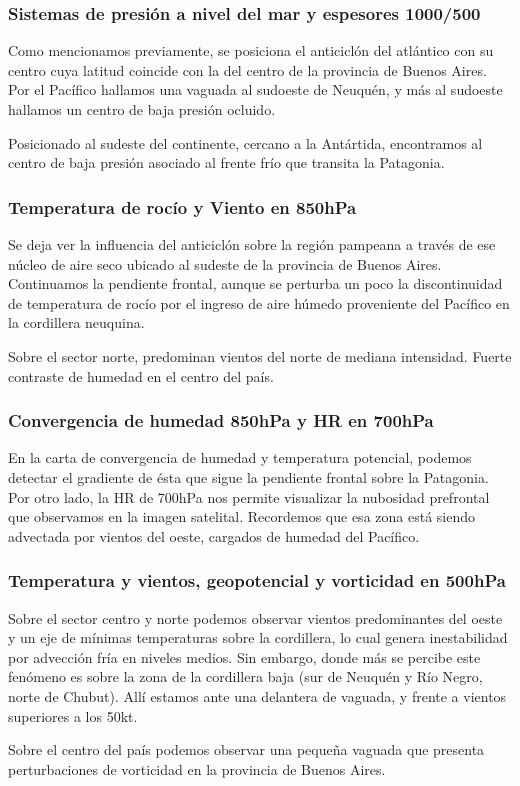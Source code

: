\documentclass{article}
\begin{document}
\subsubsection{Sistemas de presión a nivel del mar y espesores 1000/500}
Como mencionamos previamente, se posiciona el anticiclón del atlántico con su centro cuya latitud coincide con la del centro de 
la provincia de Buenos Aires. Por el Pacífico hallamos una vaguada al sudoeste de Neuquén, y más al sudoeste hallamos un centro
de baja presión ocluido.
\par Posicionado al sudeste del continente, cercano a la Antártida, encontramos al centro de baja presión asociado al frente frío que
transita la Patagonia.

\subsubsection{Temperatura de rocío y Viento en 850hPa}
Se deja ver la influencia del anticiclón sobre la región pampeana a través de ese 
núcleo de aire seco ubicado al sudeste de la provincia de Buenos Aires. Continuamos la pendiente frontal, aunque
se perturba un poco la discontinuidad de temperatura de rocío por el ingreso de aire húmedo proveniente del
Pacífico en la cordillera neuquina.
\par Sobre el sector norte, predominan vientos del norte de mediana intensidad. Fuerte contraste de humedad en el centro del país.

\subsubsection{Convergencia de humedad 850hPa y HR en 700hPa}
En la carta de convergencia de humedad y temperatura potencial, podemos detectar el gradiente de ésta que sigue la pendiente frontal
sobre la Patagonia. Por otro lado, la HR de 700hPa nos permite visualizar la nubosidad prefrontal que observamos en la imagen satelital.
Recordemos que esa zona está siendo advectada por vientos del oeste, cargados de humedad del Pacífico.

\subsubsection{Temperatura y vientos, geopotencial y vorticidad en 500hPa}
Sobre el sector centro y norte podemos observar vientos predominantes del oeste y un eje de mínimas temperaturas sobre la cordillera,
lo cual genera inestabilidad por advección fría en niveles medios. Sin embargo, donde más se percibe este fenómeno es sobre la zona de 
la cordillera baja (sur de Neuquén y Río Negro, norte de Chubut). Allí estamos ante una delantera de vaguada, y frente a vientos
superiores a los 50kt.
\par Sobre el centro del país podemos observar una pequeña vaguada que presenta perturbaciones de vorticidad en la provincia
de Buenos Aires.
\end{document}
